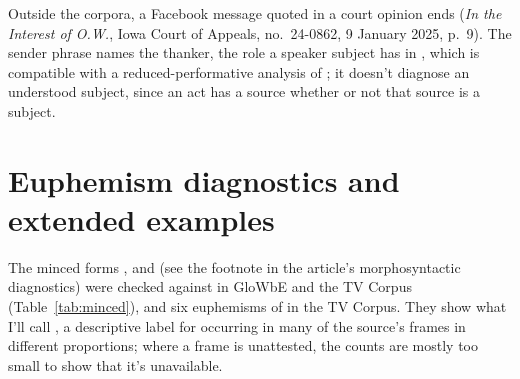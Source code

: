 \documentclass[12pt]{article}
\begin{document}
Outside the corpora, a Facebook message quoted in a court opinion ends  (\emph{In the Interest of O.W.}, Iowa Court of Appeals, no.~24-0862, 9 January 2025, p.~9). The sender phrase names the thanker, the role a speaker subject has in , which is compatible with a reduced-performative analysis of ; it doesn't diagnose an understood subject, since an act has a source whether or not that source is a subject.

\clearpage
\section{Euphemism diagnostics and extended examples}\label{supp:euphemisms}

The minced forms ,  and  (see the footnote in the article's morphosyntactic diagnostics) were checked against  in GloWbE and the TV Corpus (Table~\ref{tab:minced}), and six euphemisms of  in the TV Corpus. They show what I'll call , a descriptive label for occurring in many of the source's frames in different proportions; where a frame is unattested, the counts are mostly too small to show that it's unavailable.
\end{document}
